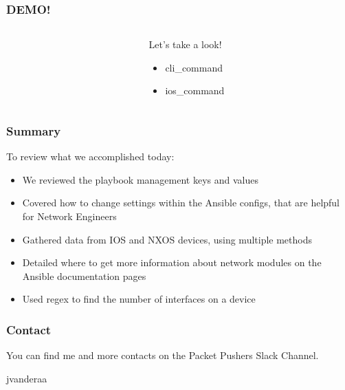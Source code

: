 \documentclass{beamer}
\begin{document}
\begin{frame}
  \frametitle{DEMO!}
  \begin{columns}
  \begin{column}{0.3\textwidth}
    \Huge
    \begin{center}
      \faDesktop 
      \hspace{.5cm}
      \faRocket     
    \end{center}
  \end{column}
  \begin{column}{0.7\textwidth}
    \huge 
    Let's take a look!
    \begin{itemize}
      \item cli\_command
      \item ios\_command
    \end{itemize}
  \end{column}
\end{columns}
\end{frame}


\begin{frame}
  \frametitle{Summary}
    To review what we accomplished today:
    \begin{itemize}
      \item <1-> We reviewed the playbook management keys and values
      \item <2-> Covered how to change settings within the Ansible configs, that are helpful for Network Engineers
      \item <3-> Gathered data from IOS and NXOS devices, using multiple methods
      \item <4-> Detailed where to get more information about network modules on the Ansible documentation pages
      \item <5-> Used regex to find the number of interfaces on a device
    \end{itemize}
\end{frame}

\begin{frame}
  \frametitle{Contact}
  \huge
  You can find me and more contacts on the Packet Pushers Slack Channel. 
  \linebreak
  \begin{center}
    \normalsize
    \faSlack \hspace{.1cm}jvanderaa  
  \end{center}
  
\end{frame}
\end{document}
